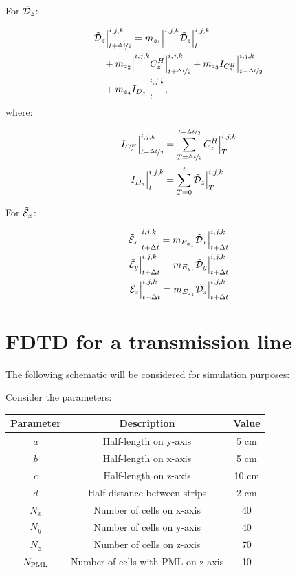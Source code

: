 For $\tilde{\mathcal{D}}_z$:

\begin{align}
    &\tilde{\mathcal{D}}_z\Big|_{t+\nicefrac{\Delta t}{2}}^{i,j,k} = m_{{z_1}}\Big|^{i,j,k} \tilde{\mathcal{D}}_z\Big|_{t}^{i,j,k} 
    \nonumber \\
    & \quad + m_{{z_2}}\Big|^{i,j,k}C_z^H\Big|^{i,j,k}_{t+\nicefrac{\Delta t}{2}} + m_{{z_3}} I_{C^H_z}\Big|^{i,j,k}_{t-\nicefrac{\Delta t}{2}} 
    \nonumber \\
    & \quad + m_{{z_4}} I_{D_z}\Big|^{i,j,k}_{t},
\end{align}
where:

\begin{align}
    I_{C^H_z}\Big|^{i,j,k}_{t-\nicefrac{\Delta t}{2}} &= \sum\limits_{T=\nicefrac{\Delta t}{2}}^{t-\nicefrac{\Delta t}{2}}C_z^H\Big|^{i,j,k}_T
    \\
    I_{D_z}\Big|^{i,j,k}_{t} &= \sum\limits_{T=0}^{t} \tilde{\mathcal{D}}_z\Big|^{i,j,k}_T
\end{align}

For $\tilde{\mathcal{E}}_x$:

\begin{align}
    \tilde{\mathcal{E}}_x\Big|^{i,j,k}_{t+\Delta t} = m_{E_{x_1}} \tilde{\mathcal{D}}_x\Big|^{i,j,k}_{t+\Delta t} \\
    \tilde{\mathcal{E}}_y\Big|^{i,j,k}_{t+\Delta t} = m_{E_{y_1}} \tilde{\mathcal{D}}_y\Big|^{i,j,k}_{t+\Delta t} \\
    \tilde{\mathcal{E}}_z\Big|^{i,j,k}_{t+\Delta t} = m_{E_{z_1}} \tilde{\mathcal{D}}_z\Big|^{i,j,k}_{t+\Delta t}
\end{align}


\section{FDTD for a transmission line}

The following schematic will be considered for simulation purposes:


Consider the parameters:

\begin{table}[H]
    \centering
    \begin{tabular}{|c|c|c|}
    \hline
    \textbf{Parameter} & \textbf{Description}               & \textbf{Value} \\ \hline
    $a$                & Half-length on y-axis              & 5 cm           \\ \hline
    $b$                & Half-length on x-axis              & 5 cm           \\ \hline
    $c$                & Half-length on z-axis              & 10 cm          \\ \hline
    $d$                & Half-distance between strips       & 2 cm           \\ \hline
    $N_x$              & Number of cells on x-axis          & 40             \\ \hline
    $N_y$              & Number of cells on y-axis          & 40             \\ \hline
    $N_z$              & Number of cells on z-axis          & 70             \\ \hline
    $N_{\textnormal{PML}}$          & Number of cells with PML on z-axis & 10             \\ \hline
    \end{tabular}
\end{table}

